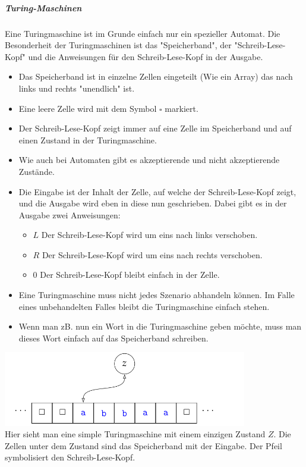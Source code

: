 \documentclass[12pt]{article}
\begin{document}
\large\subparagraph{\large Turing-Maschinen}
\normalsize
\begin{flushleft}
    Eine Turingmaschine ist im Grunde einfach nur ein spezieller Automat. Die Besonderheit der Turingmaschinen ist das "Speicherband", der
    "Schreib-Lese-Kopf" und die Anweisungen für den Schreib-Lese-Kopf in der Ausgabe.
    \begin{itemize}
        \item Das Speicherband ist in einzelne Zellen eingeteilt (Wie ein Array) das nach links und rechts "unendlich" ist.
        \item Eine leere Zelle wird mit dem Symbol $\square$ markiert.
        \item Der Schreib-Lese-Kopf zeigt immer auf eine Zelle im Speicherband und auf einen Zustand in der Turingmaschine.
        \item Wie auch bei Automaten gibt es akzeptierende und nicht akzeptierende Zustände.
        \item Die Eingabe ist der Inhalt der Zelle, auf welche der Schreib-Lese-Kopf zeigt, und die Ausgabe wird eben in diese nun geschrieben. Dabei gibt es in der Ausgabe zwei Anweisungen:
        \begin{itemize}
            \item $L$ Der Schreib-Lese-Kopf wird um eins nach links verschoben.
            \item $R$ Der Schreib-Lese-Kopf wird um eins nach rechts verschoben.
            \item $0$ Der Schreib-Lese-Kopf bleibt einfach in der Zelle.
        \end{itemize}
        \item Eine Turingmaschine muss nicht jedes Szenario abhandeln können. Im Falle eines unbehandelten Falles bleibt die Turingmaschine einfach stehen.
        \item Wenn man zB. nun ein Wort in die Turingmaschine geben möchte, muss man dieses Wort einfach auf das Speicherband schreiben.
    \end{itemize}
    \includegraphics[width=0.8\textwidth]{simple_turing.png} \\
    Hier sieht man eine simple Turingmaschine mit einem einzigen Zustand $Z$. Die Zellen unter dem Zustand sind das Speicherband mit der Eingabe. Der Pfeil symbolisiert den Schreib-Lese-Kopf.

\end{flushleft}
\end{document}
